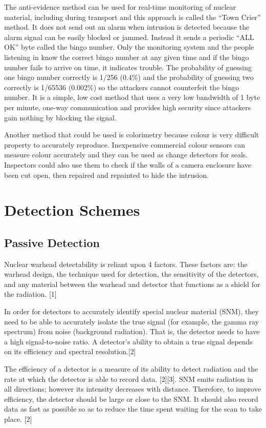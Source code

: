 \documentclass[twocolumn,a4paper]{article}
\begin{document}
The anti-evidence method can be used for real-time monitoring of
nuclear material, including during transport and this approach is
called the ``Town Crier'' method. It does not send out an alarm when
intrusion is detected because the alarm signal can be easily blocked
or jammed. Instead it sends a periodic ``ALL OK'' byte called the
bingo number. Only the monitoring system and the people listening in
know the correct bingo number at any given time and if the bingo
number fails to arrive on time, it indicates trouble. The probability
of guessing one bingo number correctly is 1/256 (0.4\%) and the
probability of guessing two correctly is 1/65536 (0.002\%) so the
attackers cannot counterfeit the bingo number. It is a simple, low
cost method that uses a very low bandwidth of 1 byte per minute,
one-way communication and provides high security since attackers gain
nothing by blocking the signal. \citep{unconventionalCoC2010}

Another method that could be used is colorimetry because colour is very
difficult property to accurately reproduce. Inexpensive commercial
colour sensors can measure colour accurately and they can be used as
change detectors for seals. Inspectors could also use them to check if
the walls of a camera enclosure have been cut open, then repaired and
repainted to hide the intrusion. \citep{unconventionalCoC2010}

\section{Detection Schemes}
\subsection{Passive Detection}

Nuclear warhead detectability is reliant upon 4 factors. These factors
are: the warhead design, the technique used for detection, the
sensitivity of the detectors, and any material between the warhead and
detector that functions as a shield for the radiation. [1]

In order for detectors to accurately identify special nuclear material
(SNM), they need to be able to accurately isolate the true signal (for
example, the gamma ray spectrum) from noise (background
radiation). That is, the detector needs to have a high signal-to-noise
ratio. A detector’s ability to obtain a true signal depends on its
efficiency and spectral resolution.[2]

The efficiency of a detector is a measure of its ability to detect
radiation and the rate at which the detector is able to record
data. [2][3]. SNM emits radiation in all directions; however its
intensity decreases with distance. Therefore, to improve efficiency,
the detector should be large or close to the SNM. It should also
record data as fast as possible so as to reduce the time spent waiting
for the scan to take place. [2]
\end{document}

